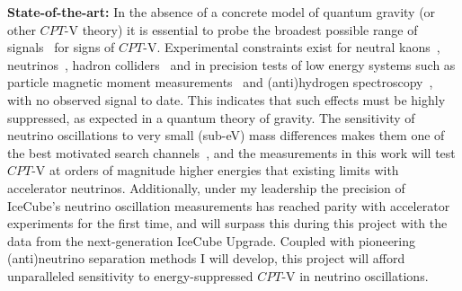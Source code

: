 \documentclass[a4paper,11pt]{article}
\begin{document}

\noindent \textbf{State-of-the-art:} In the absence of a concrete model of quantum gravity (or other $CPT$-V theory) it is essential to probe the broadest possible range of signals~\cite{hep-ph/9809542} for signs of $CPT$-V. Experimental constraints exist for neutral kaons~\cite{Ellis:1999xh, Ambrosino:2006ek, Abouzaid:2010ny, Babusci:2013gda, Schubert:2014ska}, neutrinos~\cite{Adamson:2013whj, Ohlsson:2014cha}, hadron colliders~\cite{Aad:2013eva, vanTilburg:2016awx} and in precision tests of low energy systems such as particle magnetic moment measurements~\cite{Bluhm:1997ci, Bennett:2007aa} and (anti)hydrogen spectroscopy~\cite{Kostelecky:2015nma}, with no observed signal to date. This indicates that such effects must be highly suppressed, as expected in a quantum theory of gravity. The sensitivity of neutrino oscillations to very small (sub-eV) mass differences makes them one of the best motivated search channels~\cite{PhysRevD.99.075022}, and the measurements in this work will test $CPT$-V at orders of magnitude higher energies that existing limits with accelerator neutrinos. Additionally, under my leadership the precision of IceCube's neutrino oscillation measurements has reached parity with accelerator experiments for the first time, and will surpass this during this project with the data from the next-generation IceCube Upgrade. Coupled with pioneering (anti)neutrino separation methods I will develop, this project will afford unparalleled sensitivity to energy-suppressed $CPT$-V in neutrino oscillations. \\


\end{document}
